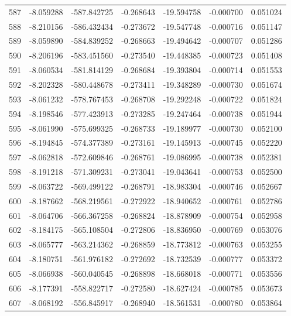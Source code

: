 \begin{tabular}{rrrrrrr}
 587 &  -8.059288 & -587.842725 & -0.268643 &  -19.594758 &   -0.000700 &  0.051024 \\
 588 &  -8.210156 & -586.432434 & -0.273672 &  -19.547748 &   -0.000716 &  0.051147 \\
 589 &  -8.059890 & -584.839252 & -0.268663 &  -19.494642 &   -0.000707 &  0.051286 \\
 590 &  -8.206196 & -583.451560 & -0.273540 &  -19.448385 &   -0.000723 &  0.051408 \\
 591 &  -8.060534 & -581.814129 & -0.268684 &  -19.393804 &   -0.000714 &  0.051553 \\
 592 &  -8.202328 & -580.448678 & -0.273411 &  -19.348289 &   -0.000730 &  0.051674 \\
 593 &  -8.061232 & -578.767453 & -0.268708 &  -19.292248 &   -0.000722 &  0.051824 \\
 594 &  -8.198546 & -577.423913 & -0.273285 &  -19.247464 &   -0.000738 &  0.051944 \\
 595 &  -8.061990 & -575.699325 & -0.268733 &  -19.189977 &   -0.000730 &  0.052100 \\
 596 &  -8.194845 & -574.377389 & -0.273161 &  -19.145913 &   -0.000745 &  0.052220 \\
 597 &  -8.062818 & -572.609846 & -0.268761 &  -19.086995 &   -0.000738 &  0.052381 \\
 598 &  -8.191218 & -571.309231 & -0.273041 &  -19.043641 &   -0.000753 &  0.052500 \\
 599 &  -8.063722 & -569.499122 & -0.268791 &  -18.983304 &   -0.000746 &  0.052667 \\
 600 &  -8.187662 & -568.219561 & -0.272922 &  -18.940652 &   -0.000761 &  0.052786 \\
 601 &  -8.064706 & -566.367258 & -0.268824 &  -18.878909 &   -0.000754 &  0.052958 \\
 602 &  -8.184175 & -565.108504 & -0.272806 &  -18.836950 &   -0.000769 &  0.053076 \\
 603 &  -8.065777 & -563.214362 & -0.268859 &  -18.773812 &   -0.000763 &  0.053255 \\
 604 &  -8.180751 & -561.976182 & -0.272692 &  -18.732539 &   -0.000777 &  0.053372 \\
 605 &  -8.066938 & -560.040545 & -0.268898 &  -18.668018 &   -0.000771 &  0.053556 \\
 606 &  -8.177391 & -558.822717 & -0.272580 &  -18.627424 &   -0.000785 &  0.053673 \\
 607 &  -8.068192 & -556.845917 & -0.268940 &  -18.561531 &   -0.000780 &  0.053864 \\

\end{tabular}
